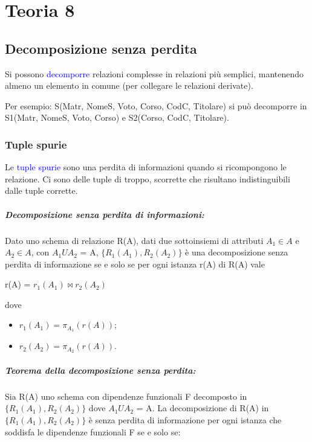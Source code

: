 \chapter{Teoria 8}

\section{Decomposizione senza perdita}

Si possono \textcolor{blue}{decomporre} relazioni complesse in relazioni più semplici, mantenendo almeno un elemento in comune (per collegare le relazioni derivate).

Per esempio: S(Matr, NomeS, Voto, Corso, CodC, Titolare) si può decomporre in S1(Matr, NomeS, Voto, Corso) e S2(Corso, CodC, Titolare).

\subsection{Tuple spurie}

Le \textcolor{blue}{tuple spurie} sono una perdita di informazioni quando si ricompongono le relazione. Ci sono delle tuple di troppo, scorrette che risultano indistinguibili dalle tuple corrette.

\paragraph{Decomposizione senza perdita di informazioni:} Dato uno schema di relazione R(A), dati due
sottoinsiemi di attributi $A_1 \in A$ e $A_2 \in A$, con $A_1 U A_2$ = A,
$\{R_1(A_1), R_2(A_2)\}$ è una decomposizione senza perdita di informazione se e solo se per ogni istanza r(A) di R(A) vale
\begin{center}
    r(A) = $r_1(A_1) \bowtie r_2(A_2)$
\end{center}

dove
\begin{itemize}
    \item $r_1(A_1) = \pi_{A_1}(r(A))$;
    \item $r_2(A_2) = \pi_{A_2}(r(A))$.
\end{itemize}

\paragraph{Teorema della decomposizione senza perdita:} Sia R(A) uno schema con dipendenze funzionali F decomposto in $\{R_1(A_1), R_2(A_2)\}$ dove $A_1 U A_2$ = A.
La decomposizione di R(A) in  $\{R_1(A_1), R_2(A_2)\}$ è senza perdita di informazione per ogni istanza che soddisfa le dipendenze funzionali F se e solo se:

